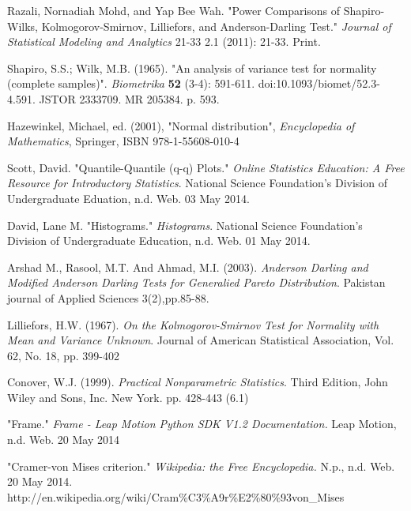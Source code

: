 \documentclass[letterpaper,english, 12pt]{article}
\begin{document}
\begin{thebibliography}{1}

	 Razali, Nornadiah Mohd, and Yap Bee Wah. "Power Comparisons of Shapiro-Wilks, Kolmogorov-Smirnov, Lilliefors, and Anderson-Darling Test." {\em Journal of Statistical Modeling and Analytics} 21-33 2.1 (2011): 21-33. Print.
		
	 Shapiro, S.S.; Wilk, M.B. (1965). "An analysis of variance test for normality (complete samples)". {\em Biometrika} \textbf{52} (3-4):  591-611. doi:10.1093/biomet/52.3-4.591. JSTOR 2333709. MR 205384. p. 593.

	 Hazewinkel, Michael, ed. (2001), "Normal distribution", {\em Encyclopedia of Mathematics}, Springer, ISBN 978-1-55608-010-4

	 Scott, David. "Quantile-Quantile (q-q) Plots." {\em Online Statistics Education: A Free Resource for Introductory Statistics}. National Science Foundation's Division of Undergraduate Eduation, n.d. Web. 03 May 2014.

	 David, Lane M. "Histograms." {\em Histograms}. National Science Foundation's Division of Undergraduate Education, n.d. Web. 01 May 2014.

	 Arshad M., Rasool, M.T. And Ahmad, M.I. (2003). {\em Anderson Darling and Modified Anderson Darling Tests for Generalied Pareto Distribution}. Pakistan journal of Applied Sciences 3(2),pp.85-88.

	 Lilliefors, H.W. (1967). {\em On the Kolmogorov-Smirnov Test for Normality with Mean and Variance Unknown}. Journal of American Statistical Association, Vol. 62, No. 18, pp. 399-402

	 Conover, W.J. (1999). {\em Practical Nonparametric Statistics}. Third Edition, John Wiley and Sons, Inc. New York. pp. 428-443 (6.1)
	
	 "Frame." {\em Frame - Leap Motion Python SDK V1.2 Documentation.} Leap Motion, n.d. Web. 20 May 2014
		
	 "Cramer-von Mises criterion." {\em Wikipedia: the Free Encyclopedia.} N.p., n.d. Web. 20 May 2014. http://en.wikipedia.org/wiki/Cram\%C3\%A9r\%E2\%80\%93von\_Mises
\end{thebibliography}
\end{document}

